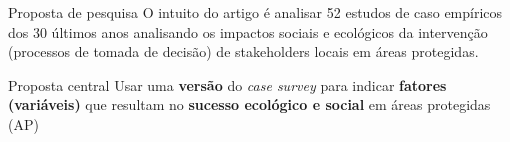 \begin{frame}{Proposta de pesquisa}
\justifying
O intuito do artigo é analisar 52 estudos de caso empíricos dos 30 últimos anos analisando os impactos sociais e ecológicos da intervenção (processos de tomada de decisão) de stakeholders locais em áreas protegidas.

\vspace{0.5em}
\begin{block}{Proposta central}
Usar uma \textbf{versão} do \textit{case survey} para indicar \textbf{fatores (variáveis)} que resultam no \textbf{sucesso ecológico e social} em áreas protegidas (AP)
\end{block}
\end{frame}